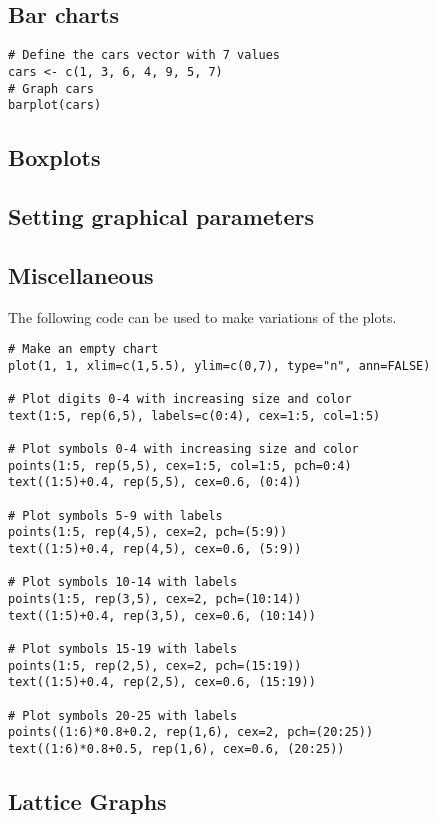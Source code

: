 \subsection{Bar charts}
\begin{framed}
\begin{verbatim}
# Define the cars vector with 7 values
cars <- c(1, 3, 6, 4, 9, 5, 7)
# Graph cars
barplot(cars)
\end{verbatim}
\end{framed}
\subsection{Boxplots}
\subsection{Setting graphical parameters}
\subsection{Miscellaneous}
The following code can be used to make variations of the plots.

\begin{framed}
\large \begin{verbatim}
# Make an empty chart
plot(1, 1, xlim=c(1,5.5), ylim=c(0,7), type="n", ann=FALSE)

# Plot digits 0-4 with increasing size and color
text(1:5, rep(6,5), labels=c(0:4), cex=1:5, col=1:5)

# Plot symbols 0-4 with increasing size and color
points(1:5, rep(5,5), cex=1:5, col=1:5, pch=0:4)
text((1:5)+0.4, rep(5,5), cex=0.6, (0:4))

# Plot symbols 5-9 with labels
points(1:5, rep(4,5), cex=2, pch=(5:9))
text((1:5)+0.4, rep(4,5), cex=0.6, (5:9))

# Plot symbols 10-14 with labels
points(1:5, rep(3,5), cex=2, pch=(10:14))
text((1:5)+0.4, rep(3,5), cex=0.6, (10:14))

# Plot symbols 15-19 with labels
points(1:5, rep(2,5), cex=2, pch=(15:19))
text((1:5)+0.4, rep(2,5), cex=0.6, (15:19))

# Plot symbols 20-25 with labels
points((1:6)*0.8+0.2, rep(1,6), cex=2, pch=(20:25))
text((1:6)*0.8+0.5, rep(1,6), cex=0.6, (20:25))
\end{verbatim}\large
\end{framed}

\subsection{Lattice Graphs}
